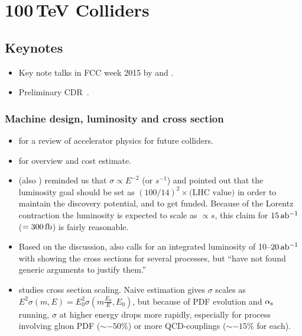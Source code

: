 \documentclass[10pt,a4paper]{article}
\newcommand{\fb}{\,{\rm fb}}
\newcommand{\iab}{\,{\rm ab^{-1}}}
\newcommand{\s}[1]{_{\rm #1}}
\begin{document}
\section[100TeV Colliders]{100\,TeV Colliders}
\subsection{Keynotes}
\begin{itemize}
 \item Key note talks in FCC week 2015 by \cite{FCCweek2015:Benedikt} and \cite{FCCweek2015:Schulte}.
 \item Preliminary CDR~\cite{CEPC-SppC-CDR}.
\end{itemize}

\subsubsection{Machine design, luminosity and cross section}
\begin{itemize}
 \item \cite{Barletta:2014vea} for a review of accelerator physics for future colliders.
 \item \cite{Assadi:2014nea} for overview and cost estimate.
 \item \cite{Richter:2014pga} (also \cite{Barletta:2014vea}) reminded us that $\sigma\propto E^{-2}$ (or $s^{-1}$) and pointed out that the luminosity goal should be set as $(100/14)^2\times\text{(LHC value)}$ in order to maintain the discovery potential, and to get funded.
       Because of the Lorentz contraction the luminosity is expected to scale as $\propto s$, this claim for $15\iab$ ($=300\fb$) is fairly reasonable.
 \item Based on the discussion, \cite{Hinchliffe:2015qma} also calls for an integrated luminosity of 10--$20\iab$ with showing the cross sections for several processes, but ``have not found generic arguments to justify them.''
\end{itemize}

\begin{itemize}
 \item \cite{Rizzo:2015yha} studies cross section scaling. Naive estimation gives $\sigma$ scales as $E^2\sigma(m,E)=E_0^2\sigma(m\frac{E_0}{E},E_0)$, but because of PDF evolution and $\alpha\s s$ running, $\sigma$ at higher energy drops more rapidly, especially for process involving gluon PDF ($\sim-50\%$) or more QCD-couplings ($\sim-15\%$ for each).
\end{itemize}
\end{document}

